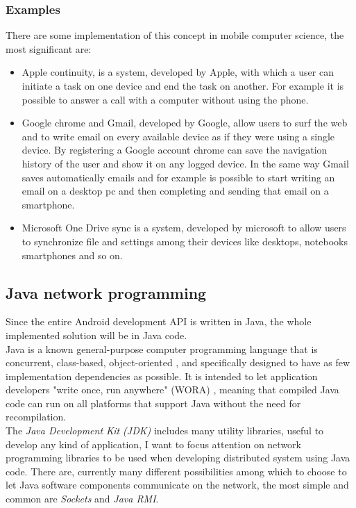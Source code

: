 \subsubsection{Examples}
There are some implementation of this concept in mobile computer science, the most significant are:
\begin{itemize}
	\item Apple continuity, is a system, developed by Apple, with which a user can initiate a task on one device and end the task on another. For example it is possible to answer a call with a computer without using the phone.
	\item Google chrome and Gmail, developed by Google, allow users to surf the web and to write email on every available device as if they were using a single device. By registering a Google account chrome can save the navigation history of the user and show it on any logged device. In the same way Gmail saves automatically emails and for example is possible to start writing an email on a desktop pc and then completing and sending that email on a smartphone.
	\item Microsoft One Drive sync is a system, developed by microsoft to allow users to synchronize file and settings among their devices like desktops, notebooks smartphones and so on.
\end{itemize}

\subsection{Java network programming}
Since the entire Android development API is written in Java, the whole implemented solution will be in Java code.\\ Java is a known general-purpose computer programming language that is concurrent, class-based, object-oriented \cite{gosling2005the}, and specifically designed to have as few implementation dependencies as possible. It is intended to let application developers "write once, run anywhere" (WORA) \cite{computer2002write}, meaning that compiled Java code can run on all platforms that support Java without the need for recompilation.\\
The \textit{Java Development Kit (JDK)} includes many utility libraries, useful to develop any kind of application, I want to focus attention on network programming libraries to be used when developing distributed system using Java code.
There are, currently many different possibilities among which to choose to let Java software components communicate on the network, the most simple and common are \textit{Sockets} and \textit{Java RMI}.
